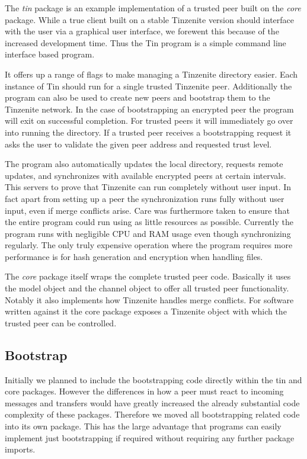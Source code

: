 The \emph{tin} package is an example implementation of a trusted peer built on the \emph{core} package.
While a true client built on a stable Tinzenite version should interface with the user via a graphical user interface, we forewent this because of the increased development time.
Thus the Tin program is a simple command line interface based program.

It offers up a range of flags to make managing a Tinzenite directory easier.
Each instance of Tin should run for a single trusted Tinzenite peer.
Additionally the program can also be used to create new peers and bootstrap them to the Tinzenite network.
In the case of bootstrapping an encrypted peer the program will exit on successful completion.
For trusted peers it will immediately go over into running the directory.
If a trusted peer receives a bootstrapping request it asks the user to validate the given peer address and requested trust level.

The program also automatically updates the local directory, requests remote updates, and synchronizes with available encrypted peers at certain intervals.
This servers to prove that Tinzenite can run completely without user input.
In fact apart from setting up a peer the synchronization runs fully without user input, even if merge conflicts arise.
Care was furthermore taken to ensure that the entire program could run using as little resources as possible.
Currently the program runs with negligible CPU and RAM usage even though synchronizing regularly.
The only truly expensive operation where the program requires more performance is for hash generation and encryption when handling files.

The \emph{core} package itself wraps the complete trusted peer code.
Basically it uses the model object and the channel object to offer all trusted peer functionality.
Notably it also implements how Tinzenite handles merge conflicts.
For software written against it the core package exposes a Tinzenite object with which the trusted peer can be controlled.

\subsection{Bootstrap}
\label{sub:Bootstrap}

Initially we planned to include the bootstrapping code directly within the tin and core packages.
However the differences in how a peer must react to incoming messages and transfers would have greatly increased the already substantial code complexity of these packages.
Therefore we moved all bootstrapping related code into its own package.
This has the large advantage that programs can easily implement just bootstrapping if required without requiring any further package imports.

